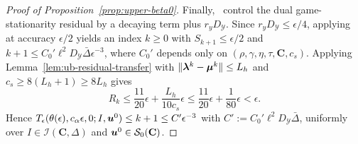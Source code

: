 \begin{proof}[Proof of Proposition~\ref{prop:upper-beta0}]
Finally,~\cite[Theorem~3.3(i) and (4.20)]{li2026smoothing} control the dual
game-stationarity residual by a decaying term plus \(r_yD_{\mathcal Y}\). Since
\(r_yD_{\mathcal Y}\le\epsilon/4\), applying~\cite[Theorem~3.3(i)]{li2026smoothing}
at accuracy \(\epsilon/2\) yields an index \(k\ge0\) with
\(S_{k+1}\le\epsilon/2\) and
\(k+1\le C_0'\ell^2D_{\mathcal Y}\bar\Delta\epsilon^{-3}\), where \(C_0'\)
depends only on \((\rho,\gamma,\eta,\tau,\mathbf C,c_s)\). Applying
Lemma~\ref{lem:ub-residual-transfer} with \(\|\bm{\lambda}^k-\bm{\mu}^k\|\le L_h\) and
\(c_s\ge8(L_h+1)\ge8L_h\) gives
\[
R_k\le\frac{11}{20}\epsilon+\frac{L_h}{10c_s}\epsilon
\le\frac{11}{20}\epsilon+\frac1{80}\epsilon<\epsilon.
\]
Hence
\(T_\epsilon(\theta(\epsilon),c_\alpha\epsilon,0;I,\bm{u}^0)\le k+1\le
C'\epsilon^{-3}\) with \(C':=C_0'\ell^2D_{\mathcal Y}\bar\Delta\), uniformly
over \(I\in\mathcal I(\mathbf C,\Delta)\) and
\(\bm{u}^0\in\mathcal S_0(\mathbf C)\).
\end{proof}

